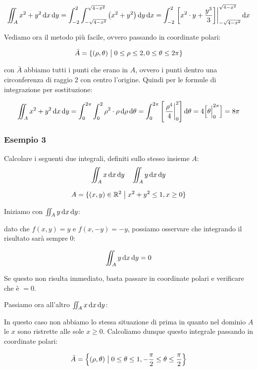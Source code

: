 \[
    \iint_A {x^{2}+y^{2}} \mathop{}\!\mathrm{d}{x}\mathop{}\!\mathrm{d}{y} = \int_{-2}^{2} \int_{-\sqrt{4-x^{2}}}^{\sqrt{4-x^{2}}} {\left(x^{2} + y^{2}\right)} \mathop{}\!\mathrm{d}{y}\mathop{}\!\mathrm{d}{x}  = \int_{-2}^{2} { \left.\left[ x^{2} \cdot y + \frac{y^{3}}{3} \right]\right\rvert_{-\sqrt{4-x^{2}}}^{\sqrt{4-x^{2}}}  \mathop{}\!\mathrm{d}{x}}
\]

Vediamo ora il metodo più facile, ovvero passando in coordinate polari:

\[
    \bar{A}  = \{(\rho,\theta) \;\big|\; 0 \le \rho \le 2, 0 \le \theta \le 2\pi \}
\]

con \(\bar{A}\) abbiamo tutti i punti che erano in \(A\), ovvero i punti dentro una circonferenza di raggio 2 con centro l'origine. Quindi per le formule di integrazione per sostituzione:

\[
    \iint_A x^{2}+y^{2} \mathop{}\!\mathrm{d}{x}\mathop{}\!\mathrm{d}{y} = \int_{0}^{2\pi} \int_{0}^{2} \rho^{2}\cdot\rho \mathop{}\!\mathrm{d}{\rho}\mathop{}\!\mathrm{d}{\theta} = \int_{0}^{2\pi} \left[ \left.\frac{\rho^4}{4}\right\rvert_{0}^{2} \right] \mathop{}\!\mathrm{d}{\theta} = 4 \Big[\theta\Big|_{0}^{2\pi}\Big] = 8\pi
\]

\pagebreak
\subsubsection*{Esempio 3}

Calcolare i seguenti due integrali, definiti sullo stesso insieme \(A\):
\[
    \iint_A x \mathop{}\!\mathrm{d}{x}\mathop{}\!\mathrm{d}{y} \quad \iint_A y \mathop{}\!\mathrm{d}{x}\mathop{}\!\mathrm{d}{y}
\]

\[
    A = \{ (x,y) \in \mathbb{R}^2 \;\big|\; x^{2}+y^{2} \le 1, x \ge 0 \}
\]

Iniziamo con \(\iint_A y \mathop{}\!\mathrm{d}{x}\mathop{}\!\mathrm{d}{y}\):

dato che \(f(x,y) = y\) e \(f(x,-y) = -y\), possiamo osservare che integrando il risultato sarà sempre 0:

\[
    \iint_A y \mathop{}\!\mathrm{d}{x}\mathop{}\!\mathrm{d}{y} = 0
\]

Se questo non risulta immediato, basta passare in coordinate polari e verificare che è \(=0\).

Passiamo ora all'altro \(\iint_A x \mathop{}\!\mathrm{d}{x}\mathop{}\!\mathrm{d}{y}\):

In questo caso non abbiamo lo stessa situazione di prima in quanto nel dominio \(A\) le \(x\) sono ristrette alle sole \(x \ge 0\). Calcoliamo dunque questo integrale passando in coordinate polari:

\[
    \bar{A} = \left\{ (\rho,\theta) \;\big|\; 0 \le \theta \le 1, - \frac{\pi}{2} \le \theta \le \frac{\pi}{2} \right\}
\]

